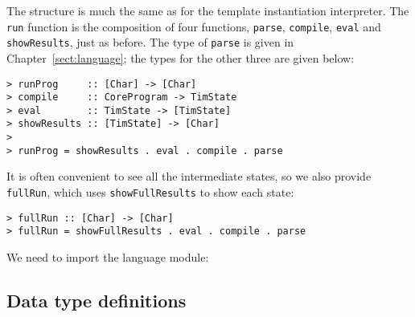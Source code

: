 The structure is much the same as for the template instantiation
interpreter.
The \mbox{\tt run} function is the composition of four functions, \mbox{\tt parse}, \mbox{\tt compile},
\mbox{\tt eval} and \mbox{\tt showResults}, just as before.  The type of \mbox{\tt parse} is given in
Chapter~\ref{sect:language}; the types for the other three are given below:
\begin{verbatim}
> runProg     :: [Char] -> [Char]
> compile     :: CoreProgram -> TimState
> eval        :: TimState -> [TimState]
> showResults :: [TimState] -> [Char]
>
> runProg = showResults . eval . compile . parse
\end{verbatim}
%
%
%
%
%
\par
It is often convenient to see all the intermediate states, so we
also provide \mbox{\tt fullRun}, which uses \mbox{\tt showFullResults} to show each state:
\begin{verbatim}
> fullRun :: [Char] -> [Char]
> fullRun = showFullResults . eval . compile . parse
\end{verbatim}
%
%
We need to import the language module:


\subsection{Data type definitions}

